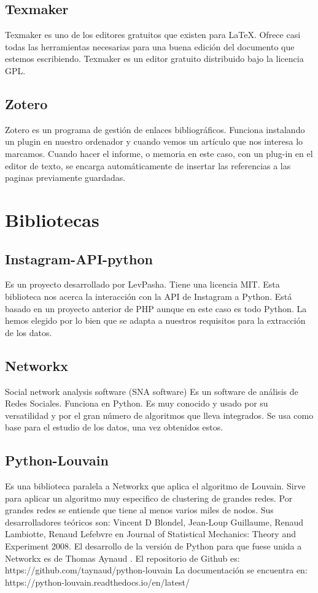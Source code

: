 \subsection{Texmaker}
Texmaker es uno de los editores gratuitos que existen para LaTeX. Ofrece casi todas las herramientas necesarias para una buena edición del documento que estemos escribiendo.
Texmaker es un editor gratuito distribuido bajo la licencia GPL. \cite{Texmaker}
\subsection{Zotero}
Zotero es un programa de gestión de enlaces bibliográficos.
Funciona instalando un plugin en nuestro ordenador y cuando vemos un artículo que nos interesa lo marcamos. Cuando hacer el informe, o memoria en este caso, con un plug-in en el editor de texto, se encarga automáticamente de insertar las referencias a las paginas previamente guardadas.

\section{Bibliotecas}
\subsection{Instagram-API-python}
Es un proyecto desarrollado por LevPasha. Tiene una licencia MIT. 
Esta biblioteca nos acerca la interacción con la API de Instagram a Python. Está basado en un proyecto anterior de PHP aunque en este caso es todo Python.
La hemos elegido por lo bien que se adapta a nuestros requisitos para la extracción de los datos.
\subsection{Networkx}
Social network analysis software (SNA software) \cite{networkx}
Es un software de análisis de Redes Sociales. Funciona en Python. Es muy conocido y usado por su versatilidad y por el gran número de algoritmos que lleva integrados.
Se usa como base para el estudio de los datos, una vez obtenidos estos.

\subsection{Python-Louvain}
Es una biblioteca paralela a Networkx que aplica el algoritmo de Louvain. 
Sirve para aplicar un algoritmo muy especifico de clustering de grandes redes. Por grandes redes se entiende que tiene al menos varios miles de nodos. Sus desarrolladores teóricos son: Vincent D Blondel, Jean-Loup Guillaume, Renaud Lambiotte, Renaud Lefebvre en Journal of Statistical Mechanics: Theory and Experiment 2008. El desarrollo de la versión de Python para que fuese unida a Networkx es de Thomas Aynaud .
El repositorio de Github es: https://github.com/taynaud/python-louvain
La documentación se encuentra en: https://python-louvain.readthedocs.io/en/latest/

